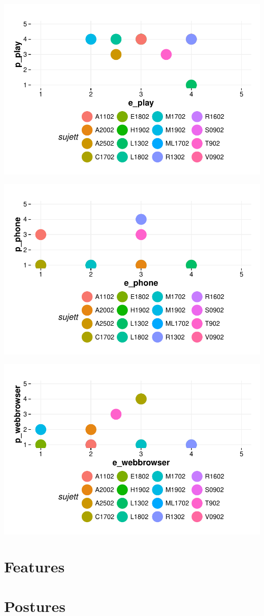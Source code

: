 \documentclass{article}
\begin{document}
\includegraphics{interviews-plot_coirs_parent_enfant_play}

\includegraphics{interviews-plot_coirs_parent_enfant_phone}

\includegraphics{interviews-plot_coirs_parent_enfant_webbrowser}



\section{Features}


\section{Postures}
\end{document}
